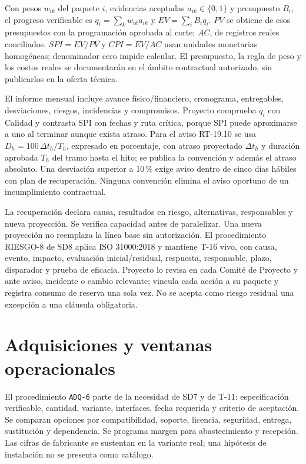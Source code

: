 Con pesos $w_{ik}$ del paquete $i$, evidencias aceptadas $a_{ik}\in\{0,1\}$ y presupuesto $B_i$, el progreso verificable es $q_i=\sum_k w_{ik}a_{ik}$ y $EV=\sum_i B_iq_i$. $PV$ se obtiene de esos presupuestos con la programación aprobada al corte; $AC$, de registros reales conciliados. $SPI=EV/PV$ y $CPI=EV/AC$ usan unidades monetarias homogéneas; denominador cero impide calcular. El presupuesto, la regla de peso y los costos reales se documentarán en el ámbito contractual autorizado, sin publicarlos en la oferta técnica. \parencites[p.~1]{sd6-nasa}[RT-19.06/07, p.~34]{sd6-bt}[art.~50.2, p.~29]{sd6-ba}

El informe mensual incluye avance físico/financiero, cronograma, entregables, desviaciones, riesgos, incidencias y compromisos. Proyecto comprueba $q_i$ con Calidad y contrasta SPI con fechas y ruta crítica, porque SPI puede aproximarse a uno al terminar aunque exista atraso. Para el aviso RT-19.10 se usa $D_h=100\,\Delta t_h/T_h$, expresado en porcentaje, con atraso proyectado $\Delta t_h$ y duración aprobada $T_h$ del tramo hasta el hito; se publica la convención y además el atraso absoluto. Una desviación superior a 10\,\% exige aviso dentro de cinco días hábiles con plan de recuperación. Ninguna convención elimina el aviso oportuno de un incumplimiento contractual.

La recuperación declara causa, resultados en riesgo, alternativas, responsables y nueva proyección. Se verifica capacidad antes de paralelizar. Una nueva proyección no reemplaza la línea base sin autorización. El procedimiento RIESGO-8 de SD8 aplica ISO 31000:2018 y mantiene T-16 vivo, con causa, evento, impacto, evaluación inicial/residual, respuesta, responsable, plazo, disparador y prueba de eficacia. Proyecto lo revisa en cada Comité de Proyecto y ante aviso, incidente o cambio relevante; vincula cada acción a su paquete y registra consumo de reserva una sola vez. No se acepta como riesgo residual una excepción a una cláusula obligatoria. \parencites[RT-19.04/10, pp.~33--34]{sd6-bt}{sd6-iso31000}

\section{Adquisiciones y ventanas operacionales}
El procedimiento \texttt{ADQ-6} parte de la necesidad de SD7 y de T-11: especificación verificable, cantidad, variante, interfaces, fecha requerida y criterio de aceptación. Se comparan opciones por compatibilidad, soporte, licencia, seguridad, entrega, sustitución y dependencia. Se programa margen para abastecimiento y recepción. Las cifras de fabricante se sustentan en la variante real; una hipótesis de instalación no se presenta como catálogo.

